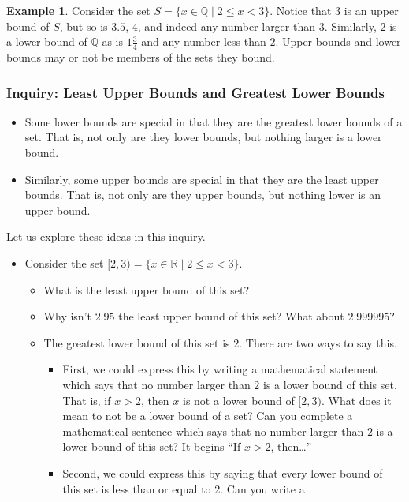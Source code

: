 \documentclass[11pt]{article}
\newenvironment{task}
	{\begin{mdframed}[linecolor=lightgray, linewidth=3pt]\raggedright}
	{\end{mdframed}}
\theoremstyle{definition}
\newtheorem{example}[theorem]{Example}
\begin{document}
\begin{example}
  Consider the set $S = \{ x \in \mathbb{Q} \mid 2 \leq x < 3 \}$. Notice that
  $3$ is an upper bound of $S$, but so is $3.5$, $4$, and indeed any number larger
  than $3$. Similarly, $2$ is a lower bound of $\mathbb{Q}$ as is $1\frac{3}{4}$ and
  any number less than $2$. Upper bounds and lower bounds may or not be members of
  the sets they bound.
\end{example}

\subsubsection{Inquiry: Least Upper Bounds and Greatest Lower Bounds}
\begin{task}
  \begin{itemize}
    \item Some lower bounds are special in that they are the greatest lower bounds of a set. That is, not only are they lower
      bounds, but nothing larger is a lower bound.
    \item Similarly, some upper bounds are special in that they are the least upper bounds. That is, not only are they upper bounds,
      but nothing lower is an upper bound.
  \end{itemize}
  Let us explore these ideas in this inquiry.
  \begin{itemize}
    \item Consider the set $[2,3)=\{ x\in\mathbb{R} \mid 2 \leq x < 3 \}$. 
    \begin{itemize}
      \item What is the least upper bound of this set?
      \item Why isn't $2.95$ the least upper bound of this set? What about $2.999995$? 
      \item The greatest lower bound of this set is $2$. There are two ways to say this.
        \begin{itemize}
          \item First, we could express this by writing a mathematical statement which says that no number
          larger than $2$ is a lower bound of this set. That is, if $x > 2$, then $x$ is not a lower bound of $[2,3)$. What does it 
          mean to not be a lower bound of a set? Can you complete a mathematical sentence which says that no number
          larger than $2$ is a lower bound of this set? It begins ``If $x > 2$, then\dots''
        \item Second, we could express this by saying that every lower bound of this set is less than or equal to 2. Can you write a 

\end{itemize}
\end{itemize}
\end{itemize}
\end{task}
\end{document}
